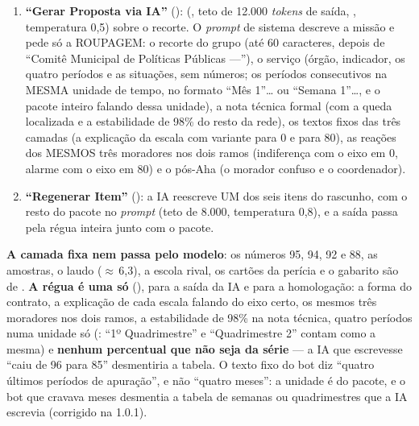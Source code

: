 \begin{enumerate}
  \item \textbf{\enquote{Gerar Proposta via IA}} ():
     (, teto de 12.000 \emph{tokens} de
    saída, , temperatura 0,5) sobre o recorte. O \emph{prompt}
    de sistema descreve a missão e pede só a ROUPAGEM: o recorte do grupo (até
    60 caracteres, depois de \enquote{Comitê Municipal de Políticas Públicas
    ---}), o serviço (órgão, indicador, os quatro períodos e as situações, sem
    números; os períodos consecutivos na MESMA unidade de tempo, no formato
    \enquote{Mês 1}\ldots{} ou \enquote{Semana 1}\ldots, e o pacote inteiro
    falando dessa unidade), a nota técnica formal (com a queda localizada e a estabilidade
    de 98\% do resto da rede), os textos fixos das três camadas (a explicação
    da escala com variante para 0 e para 80), as reações dos MESMOS três
    moradores nos dois ramos (indiferença com o eixo em 0, alarme com o eixo
    em 80) e o pós-Aha (o morador confuso e o coordenador).
  \item \textbf{\enquote{Regenerar Item}} (): a IA reescreve UM dos seis itens
    do rascunho, com o resto do pacote no \emph{prompt} (teto de 8.000,
    temperatura 0,8), e a saída passa pela régua inteira junto com o pacote.
\end{enumerate}

\textbf{A camada fixa nem passa pelo modelo}: os números 95, 94, 92 e 88, as
amostras, o laudo ($\approx$\,6,3), a escola rival, os cartões da perícia e o
gabarito são de . \textbf{A régua é uma só}
(), para a saída da IA e para a
homologação: a forma do contrato, a explicação de cada escala falando do
eixo certo, os mesmos três moradores nos dois ramos, a estabilidade de 98\%
na nota técnica, quatro períodos numa unidade só (:
\enquote{1º Quadrimestre} e \enquote{Quadrimestre 2} contam como a mesma) e \textbf{nenhum percentual que não seja da
série} --- a IA que escrevesse \enquote{caiu de 96 para 85} desmentiria a
tabela. O texto fixo do bot diz \enquote{quatro últimos períodos de
apuração}, e não \enquote{quatro meses}: a unidade é do pacote, e o bot que
cravava meses desmentia a tabela de semanas ou quadrimestres que a IA
escrevia (corrigido na 1.0.1).

